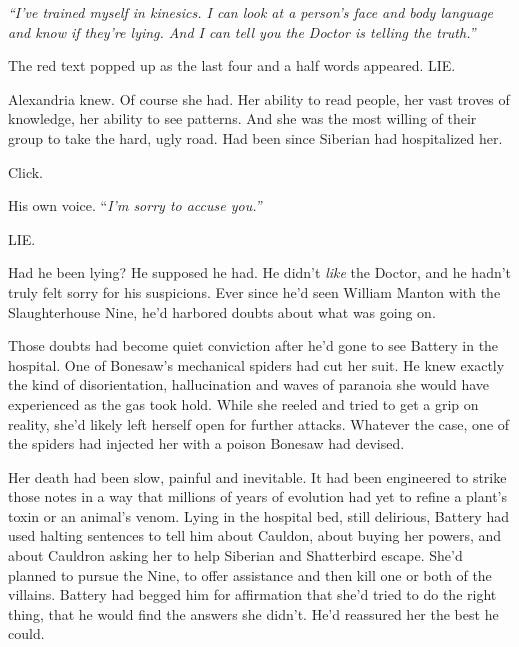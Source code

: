 \emph{``I've trained myself in kinesics.  I can look at a person's face and body language and know if they're lying.  And I can tell you the Doctor is telling the truth.''}



The red text popped up as the last four and a half words appeared.  LIE.



Alexandria knew.  Of course she had.  Her ability to read people, her vast troves of knowledge, her ability to see patterns.  And she was the most willing of their group to take the hard, ugly road.  Had been since Siberian had hospitalized her.



Click.



His own voice.  ``\emph{I'm sorry to accuse you.''}



LIE.



Had he been lying?  He supposed he had.  He didn't \emph{like} the Doctor, and he hadn't truly felt sorry for his suspicions.  Ever since he'd seen William Manton with the Slaughterhouse Nine, he'd harbored doubts about what was going on.



Those doubts had become quiet conviction after he'd gone to see Battery in the hospital.  One of Bonesaw's mechanical spiders had cut her suit.  He knew exactly the kind of disorientation, hallucination and waves of paranoia she would have experienced as the gas took hold.  While she reeled and tried to get a grip on reality, she'd likely left herself open for further attacks.  Whatever the case, one of the spiders had injected her with a poison Bonesaw had devised.



Her death had been slow, painful and inevitable.  It had been engineered to strike those notes in a way that millions of years of evolution had yet to refine a plant's toxin or an animal's venom.  Lying in the hospital bed, still delirious, Battery had used halting sentences to tell him about Cauldon, about buying her powers, and about Cauldron asking her to help Siberian and Shatterbird escape.  She'd planned to pursue the Nine, to offer assistance and then kill one or both of the villains.  Battery had begged him for affirmation that she'd tried to do the right thing, that he would find the answers she didn't.  He'd reassured her the best he could.



